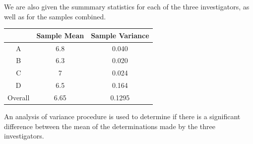 \noindent We are also given the summmary statistics for each of the three investigators, as well as for the samples combined.
\begin{center}
	\begin{tabular}{|c|c|c|}
		\hline  & Sample Mean & Sample Variance \\ 
		\hline A & 6.8 & 0.040 \\ 
		\hline B & 6.3 & 0.020 \\ 
		\hline C & 7 & 0.024 \\ 
		\hline D & 6.5 &  0.164\\
		\hline Overall & 6.65 & 0.1295 \\ 
		\hline 
	\end{tabular} 
\end{center}
\noindent An analysis of variance procedure is used to determine if there is a significant difference between the mean of the determinations made by the three investigators.


%
%
%
%
%
%

%
%
%
\smallskip

